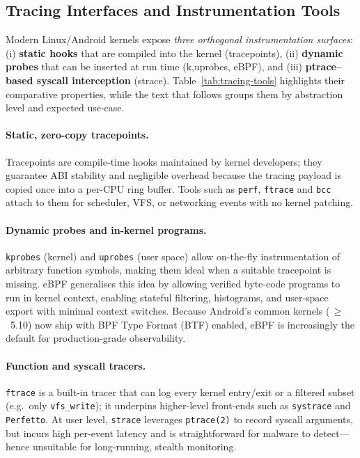 \documentclass[a4paper,12pt]{report}
\begin{document}
\subsection{Tracing Interfaces and Instrumentation Tools}

Modern Linux/Android kernels expose \emph{three orthogonal instrumentation surfaces}: (i) \textbf{static hooks} that are compiled into the kernel (tracepoints), (ii) \textbf{dynamic probes} that can be inserted at run time (k{,u}probes, eBPF), and (iii) \textbf{ptrace--based syscall interception} (strace).  Table~\ref{tab:tracing-tools} highlights their comparative properties, while the text that follows groups them by abstraction level and expected use-case.

\paragraph{Static, zero-copy tracepoints.}
Tracepoints are compile-time hooks maintained by kernel developers; they guarantee ABI stability and negligible overhead because the tracing payload is copied once into a per-CPU ring buffer.  Tools such as \texttt{perf}, \texttt{ftrace} and \texttt{bcc} attach to them for scheduler, VFS, or networking events with no kernel patching.

\paragraph{Dynamic probes and in-kernel programs.}
\texttt{kprobes} (kernel) and \texttt{uprobes} (user space) allow on-the-fly instrumentation of arbitrary function symbols, making them ideal when a suitable tracepoint is missing.  eBPF generalises this idea by allowing verified byte-code programs to run in kernel context, enabling stateful filtering, histograms, and user-space export with minimal context switches.  Because Android’s common kernels (\,$\ge$~5.10) now ship with BPF Type Format (BTF) enabled, eBPF is increasingly the default for production-grade observability.

\paragraph{Function and syscall tracers.}
\texttt{ftrace} is a built-in tracer that can log every kernel entry/exit or a filtered subset (e.g.\ only \texttt{vfs\_write}); it underpins higher-level front-ends such as \texttt{systrace} and \texttt{Perfetto}.  At user level, \texttt{strace} leverages \texttt{ptrace(2)} to record syscall arguments, but incurs high per-event latency and is straightforward for malware to detect—hence unsuitable for long-running, stealth monitoring.
\end{document}
